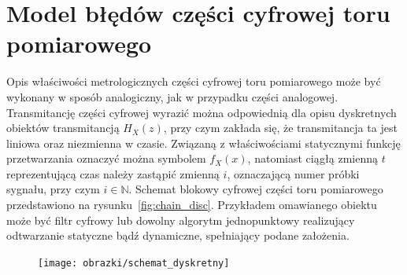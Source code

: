 \section{Model błędów części cyfrowej toru pomiarowego}

Opis właściwości metrologicznych części cyfrowej toru pomiarowego może być wykonany w sposób analogiczny, jak w przypadku części analogowej. Transmitancję części cyfrowej wyrazić można odpowiednią dla opisu dyskretnych obiektów transmitancją $H_{X}(z)$, przy czym zakłada się, że transmitancja ta jest liniowa oraz niezmienna w czasie. Związaną z właściwościami statycznymi funkcję przetwarzania oznaczyć można symbolem $f_{X}(x)$, natomiast ciągłą zmienną $t$ reprezentującą czas należy zastąpić zmienną $i$, oznaczającą numer próbki sygnału, przy czym $i \in \mathbb{N}$. Schemat blokowy cyfrowej części toru pomiarowego przedstawiono na rysunku~\ref{fig:chain_disc}. Przykładem omawianego obiektu może być filtr cyfrowy lub dowolny algorytm jednopunktowy realizujący odtwarzanie statyczne bądź dynamiczne, spełniający podane założenia.

\begin{figure}[htb!]
\begin{center}
\texttt{[image: obrazki/schemat\_dyskretny]}
\end{center}
\end{figure}

